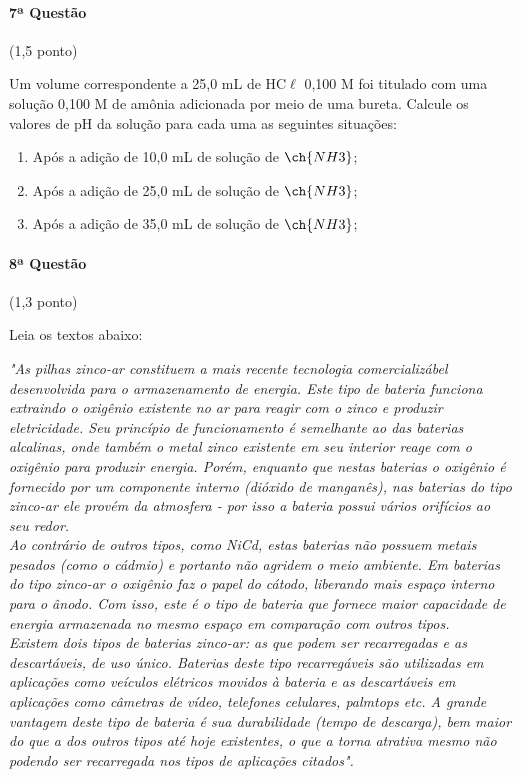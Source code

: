 \documentclass[12pt,a4paper]{article}
\begin{document}
\paragraph{7ª Questão} (1,5 ponto)

Um volume correspondente a 25,0 mL de HC$\ell$ 0,100 M foi titulado com uma solução 0,100 M de amônia adicionada por meio de uma bureta. Calcule os valores de pH da solução para cada uma as seguintes situações:
\begin{enumerate}[label=\alph* .]
\item Após a adição de 10,0 mL de solução de $\ch{NH3}$;
\item Após a adição de 25,0 mL de solução de $\ch{NH3}$;
\item Após a adição de 35,0 mL de solução de $\ch{NH3}$;
\end{enumerate}


\paragraph{8ª Questão} (1,3 ponto)

Leia os textos abaixo:

\textit{"As pilhas zinco-ar constituem a mais recente tecnologia comercializábel desenvolvida para o armazenamento de energia. Este tipo de bateria funciona extraindo o oxigênio existente no ar para reagir com o zinco e produzir eletricidade. Seu princípio de funcionamento é semelhante ao das baterias alcalinas, onde também o metal zinco existente em seu interior reage com o oxigênio para produzir energia. Porém, enquanto que nestas baterias o oxigênio é fornecido por um componente interno (dióxido de manganês), nas baterias do tipo zinco-ar ele provém da atmosfera - por isso a bateria possui vários orifícios ao seu redor.\\ Ao contrário de outros tipos, como NiCd, estas baterias não possuem metais pesados (como o cádmio) e portanto não agridem o meio ambiente. Em baterias do tipo zinco-ar o oxigênio faz o papel do cátodo, liberando mais espaço interno para o ânodo. Com isso, este é o tipo de bateria que fornece maior capacidade de energia armazenada no mesmo espaço em comparação com outros tipos.\\ Existem dois tipos de baterias zinco-ar: as que podem ser recarregadas e as descartáveis, de uso único. Baterias deste tipo recarregáveis são utilizadas em aplicações como veículos elétricos movidos à bateria e as descartáveis em aplicações como câmetras de vídeo, telefones celulares, palmtops etc. A grande vantagem deste tipo de bateria é sua durabilidade (tempo de descarga), bem maior do que a dos outros tipos até hoje existentes, o que a torna atrativa mesmo não podendo ser recarregada nos tipos de aplicações citados".}\\ \dotfill 
\end{document}
